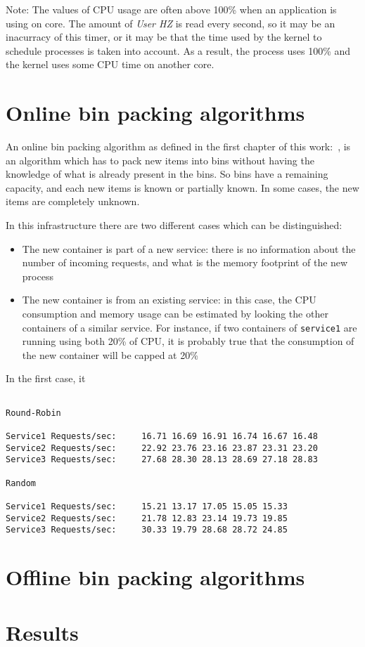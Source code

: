 Note: The values of CPU usage are often above 100\% when an application is
using on core.  The amount of \textit{User HZ} is read every second, so it may
be an inacurracy of this timer, or it may be that the time used by the kernel
to schedule processes is taken into account. As a result, the process uses
100\% and the kernel uses some CPU time on another core.

\section{Online bin packing algorithms}

An online bin packing algorithm as defined in the first chapter of this
work:~, is an algorithm which has to pack new items into
bins without having the knowledge of what is already present in the bins. So
bins have a remaining capacity, and each new items is known or partially known.
In some cases, the new items are completely unknown.

In this infrastructure there are two different cases which can be distinguished:

\begin{itemize}
\item{The new container is part of a new service: there is no information about
the number of incoming requests, and what is the memory footprint of the new process}
\item{The new container is from an existing service: in this case, the CPU consumption
and memory usage can be estimated by looking the other containers of a similar service.
For instance, if two containers of \texttt{service1} are running using both 20\% of CPU,
it is probably true that the consumption of the new container will be capped at 20\%}
\end{itemize}

In the first case, it

\begin{verbatim}

Round-Robin

Service1 Requests/sec:     16.71 16.69 16.91 16.74 16.67 16.48
Service2 Requests/sec:     22.92 23.76 23.16 23.87 23.31 23.20
Service3 Requests/sec:     27.68 28.30 28.13 28.69 27.18 28.83

Random

Service1 Requests/sec:     15.21 13.17 17.05 15.05 15.33
Service2 Requests/sec:     21.78 12.83 23.14 19.73 19.85
Service3 Requests/sec:     30.33 19.79 28.68 28.72 24.85

\end{verbatim}


\section{Offline bin packing algorithms}
\section{Results}


